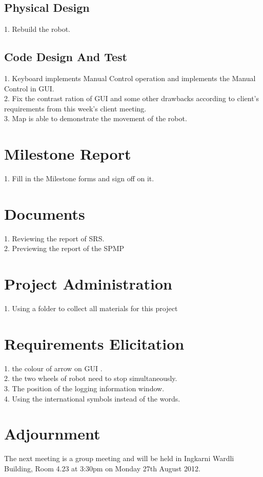 \documentclass[11pt, a4paper]{article}
\begin{document}
\subsection{Physical Design}
1. Rebuild the robot.

\subsection{Code Design And Test}
1. Keyboard implements Manual Control operation and implements the Manual Control in GUI.\\
2. Fix the contrast ration of GUI and some other drawbacks according to client's requirements from this week's client meeting.\\
3. Map is able to demonstrate the movement of the robot.

\section{Milestone Report}
1. Fill in the Milestone forms and sign off on it.

\section{Documents}
1. Reviewing the report of SRS.\\
2. Previewing the report of the SPMP 


\section{Project Administration}
1. Using a folder to collect all materials for this project


\section{Requirements Elicitation}
1. the colour of arrow on GUI .\\
2. the two wheels of robot need to stop simultaneously.\\
3. The position of the logging information window.\\
4. Using the international symbols instead of the words.  

\section{Adjournment}
The next meeting is a group meeting and will be held in Ingkarni Wardli Building, Room 4.23 at 3:30pm on Monday 27th August 2012.

\vspace*{10pt}
\end{document}
